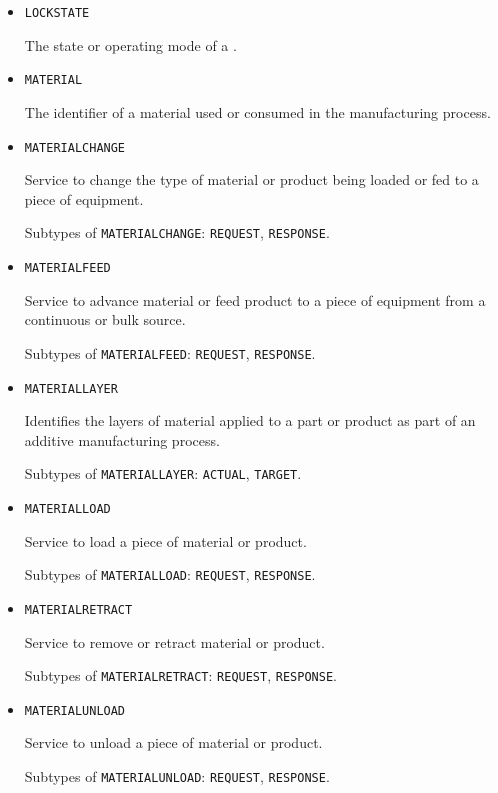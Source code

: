 \begin{itemize}
\item \texttt{LOCK\textunderscore STATE}  

The state or operating mode of a .


\item \texttt{MATERIAL}  

The identifier of a material used or consumed in the manufacturing process.


\item \texttt{MATERIAL\textunderscore CHANGE}  

Service to change the type of material or product being loaded or fed to a piece of equipment.

Subtypes of \texttt{MATERIAL\textunderscore CHANGE}: \texttt{REQUEST}, \texttt{RESPONSE}.

\item \texttt{MATERIAL\textunderscore FEED}  

Service to advance material or feed product to a piece of equipment from a continuous or bulk source.

Subtypes of \texttt{MATERIAL\textunderscore FEED}: \texttt{REQUEST}, \texttt{RESPONSE}.

\item \texttt{MATERIAL\textunderscore LAYER}  

Identifies the layers of material applied to a part or product as part of an additive manufacturing process.

Subtypes of \texttt{MATERIAL\textunderscore LAYER}: \texttt{ACTUAL}, \texttt{TARGET}.

\item \texttt{MATERIAL\textunderscore LOAD}  

Service to load a piece of material or product.

Subtypes of \texttt{MATERIAL\textunderscore LOAD}: \texttt{REQUEST}, \texttt{RESPONSE}.

\item \texttt{MATERIAL\textunderscore RETRACT}  

Service to remove or retract material or product.

Subtypes of \texttt{MATERIAL\textunderscore RETRACT}: \texttt{REQUEST}, \texttt{RESPONSE}.

\item \texttt{MATERIAL\textunderscore UNLOAD}  

Service to unload a piece of material or product.

Subtypes of \texttt{MATERIAL\textunderscore UNLOAD}: \texttt{REQUEST}, \texttt{RESPONSE}.


\end{itemize}
